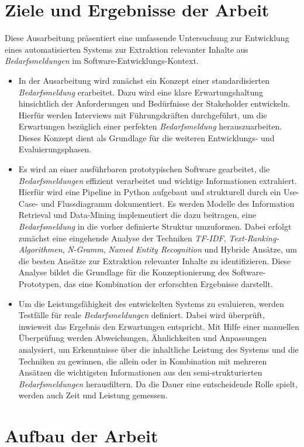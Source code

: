 \section{Ziele und Ergebnisse der Arbeit}
\label{sec:zieleundergebnis}
Diese Ausarbeitung präsentiert eine umfassende Untersuchung zur Entwicklung eines automatisierten Systems zur Extraktion relevanter Inhalte aus \emph{Bedarfsmeldungen} im Software-Entwicklungs-Kontext.
\begin{itemize}
	\item In der Ausarbeitung wird zunächst ein Konzept einer standardisierten \emph{Bedarfsmeldung} erarbeitet. Dazu wird eine klare Erwartungshaltung hinsichtlich der Anforderungen und Bedürfnisse der Stakeholder entwickeln. Hierfür werden Interviews mit Führungskräften durchgeführt, um die Erwartungen bezüglich einer \glqq{}perfekten\grqq{} \emph{Bedarfsmeldung} herauszuarbeiten. Dieses Konzept dient als Grundlage für die weiteren Entwicklungs- und Evaluierungsphasen.
	\item Es wird an einer ausführbaren prototypischen Software gearbeitet, die \emph{Bedarfsmeldungen} effizient verarbeitet und wichtige Informationen extrahiert. Hierfür wird eine Pipeline in Python aufgebaut und strukturell durch ein Use-Case- und Flussdiagramm dokumentiert. Es werden Modelle des Information Retrieval und Data-Mining implementiert die dazu beitragen, eine \emph{Bedarfsmeldung} in die vorher definierte Struktur umzuformen. Dabei erfolgt zunächst eine eingehende Analyse der Techniken \emph{TF-IDF}, \emph{Text-Ranking-Algorithmen}, \emph{N-Gramm}, \emph{Named Entity Recognition} und Hybride Ansätze, um die besten Ansätze zur Extraktion relevanter Inhalte zu identifizieren. Diese Analyse bildet die Grundlage für die Konzeptionierung des Software-Prototypen, das eine Kombination der erforschten Ergebnisse darstellt.
	\item Um die Leistungsfähigkeit des entwickelten Systems zu evaluieren, werden Testfälle für reale \emph{Bedarfsmeldungen} definiert. Dabei wird überprüft, inwieweit das Ergebnis den Erwartungen entspricht. Mit Hilfe einer manuellen Überprüfung werden Abweichungen, Ähnlichkeiten und Anpassungen analysiert, um Erkenntnisse über die inhaltliche Leistung des Systems und die Techniken zu gewinnen, die allein oder in Kombination mit mehreren Ansätzen die wichtigsten Informationen aus den semi-strukturierten \emph{Bedarfsmeldungen} herausfiltern. Da die Dauer eine entscheidende Rolle spielt, werden auch Zeit und Leistung gemessen. %
\end{itemize}
\section{Aufbau der Arbeit}
\newpage

